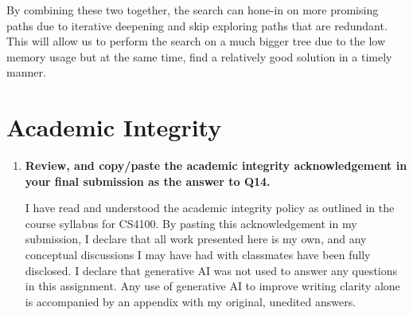 \documentclass[a4paper]{article}
\begin{document}
\begin{sloppypar}
\begin{enumerate}[start=12,label=Q\arabic*,left=0pt]
    By combining these two together, the search can hone-in on more promising paths due to iterative deepening and
    skip exploring paths that are redundant. This will allow us to perform the search on a much bigger tree due to the low memory usage
    but at the same time, find a relatively good solution in a timely manner.

\end{enumerate}

\section{Academic Integrity}

\begin{enumerate}[start=14,label=Q\arabic*,left=0pt]
    \item \textbf{Review, and copy/paste the academic integrity acknowledgement in your final submission as the answer to Q14.}
    \par I have read and understood the academic integrity policy as outlined in the course syllabus for CS4100. 
    By pasting this acknowledgement in my submission, I declare that all work presented here is my own, 
    and any conceptual discussions I may have had with classmates have been fully disclosed. I declare that generative AI 
    was not used to answer any questions in this assignment. Any use of generative AI to improve writing clarity 
    alone is accompanied by an appendix with my original, unedited answers.
\end{enumerate}
\end{sloppypar}



\end{document}
